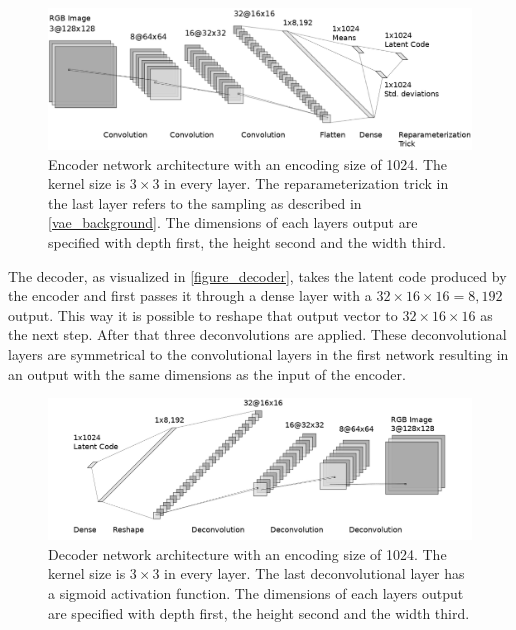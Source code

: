\begin{figure}[H]
    \centering
    \includegraphics[width=\textwidth]{images/figures/encoder_neural_network.png}
    \caption{Encoder network architecture with an encoding size of 1024.
    The kernel size is $3\times 3$ in every layer. The 
    reparameterization trick in the last layer
    refers to the sampling as described in \autoref{vae_background}.
    The dimensions of each layers output are specified with
    depth first, the height second and the width third.} \label{figure_pure_convolutional_encoder}
\end{figure}

The decoder, as visualized in \autoref{figure_decoder}, takes the latent code produced by the encoder and 
first passes it through a dense layer with a $32\times16\times16=8,192$ output. This way it is possible to reshape that
output vector to $32\times 16\times 16$ as the next step. After that three deconvolutions are applied.
These deconvolutional layers are symmetrical to the convolutional layers in the first network resulting in an 
output with the same dimensions as the input of the encoder. 

\begin{figure}[H]
    \centering
    \includegraphics[width=\textwidth]{images/figures/decoder_neural_network.png}
    \caption{Decoder network architecture with an encoding size of 1024.
    The kernel size is $3\times 3$ in every layer. The last deconvolutional layer has a sigmoid activation
    function. The dimensions of each layers output are specified with
    depth first, the height second and the width third.} \label{figure_decoder}
\end{figure}

